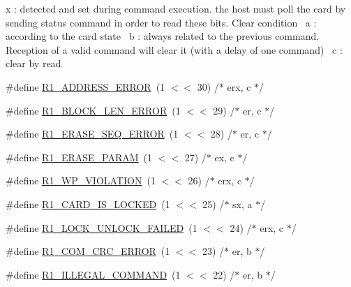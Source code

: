 \begin{DoxyCompactItemize}
\begin{DoxyCompactList}
 x \+: detected and set during command execution. the host must poll the card by sending status command in order to read these bits. Clear condition~\newline
 a \+: according to the card state~\newline
 b \+: always related to the previous command. Reception of a valid command will clear it (with a delay of one command)~\newline
 c \+: clear by read~\newline
 \end{DoxyCompactList}\item 
\#define \hyperlink{group___c_h_i_p___s_d_m_m_c___definitions_ga84256fd9d0fbf84f1c8fabd17d3f7adc}{R1\+\_\+\+A\+D\+D\+R\+E\+S\+S\+\_\+\+E\+R\+R\+OR}~(1 $<$$<$ 30)	/$\ast$ erx, c $\ast$/
\item 
\#define \hyperlink{group___c_h_i_p___s_d_m_m_c___definitions_ga392dd1fd478db2f72eb4b4c5069633f1}{R1\+\_\+\+B\+L\+O\+C\+K\+\_\+\+L\+E\+N\+\_\+\+E\+R\+R\+OR}~(1 $<$$<$ 29)	/$\ast$ er, c $\ast$/
\item 
\#define \hyperlink{group___c_h_i_p___s_d_m_m_c___definitions_ga500d03db4c4d8992c861232b015e5a4b}{R1\+\_\+\+E\+R\+A\+S\+E\+\_\+\+S\+E\+Q\+\_\+\+E\+R\+R\+OR}~(1 $<$$<$ 28)	/$\ast$ er, c $\ast$/
\item 
\#define \hyperlink{group___c_h_i_p___s_d_m_m_c___definitions_gacf512ef7effde3325f54096ba31f5499}{R1\+\_\+\+E\+R\+A\+S\+E\+\_\+\+P\+A\+R\+AM}~(1 $<$$<$ 27)	/$\ast$ ex, c $\ast$/
\item 
\#define \hyperlink{group___c_h_i_p___s_d_m_m_c___definitions_ga84f6d61dd984a9fd727ad6a810947c1d}{R1\+\_\+\+W\+P\+\_\+\+V\+I\+O\+L\+A\+T\+I\+ON}~(1 $<$$<$ 26)	/$\ast$ erx, c $\ast$/
\item 
\#define \hyperlink{group___c_h_i_p___s_d_m_m_c___definitions_ga249bcd9a38ba41b3829bca4094a5ecfd}{R1\+\_\+\+C\+A\+R\+D\+\_\+\+I\+S\+\_\+\+L\+O\+C\+K\+ED}~(1 $<$$<$ 25)	/$\ast$ sx, a $\ast$/
\item 
\#define \hyperlink{group___c_h_i_p___s_d_m_m_c___definitions_ga744d98d4c048190b483002c3e296ba1f}{R1\+\_\+\+L\+O\+C\+K\+\_\+\+U\+N\+L\+O\+C\+K\+\_\+\+F\+A\+I\+L\+ED}~(1 $<$$<$ 24)	/$\ast$ erx, c $\ast$/
\item 
\#define \hyperlink{group___c_h_i_p___s_d_m_m_c___definitions_gac9f596336ebcb43f5c9e314ad697a8e8}{R1\+\_\+\+C\+O\+M\+\_\+\+C\+R\+C\+\_\+\+E\+R\+R\+OR}~(1 $<$$<$ 23)	/$\ast$ er, b $\ast$/
\item 
\#define \hyperlink{group___c_h_i_p___s_d_m_m_c___definitions_ga317730607b37d51a7a470e8f33fa0e4d}{R1\+\_\+\+I\+L\+L\+E\+G\+A\+L\+\_\+\+C\+O\+M\+M\+A\+ND}~(1 $<$$<$ 22)	/$\ast$ er, b $\ast$/
$$
\end{DoxyCompactItemize}
